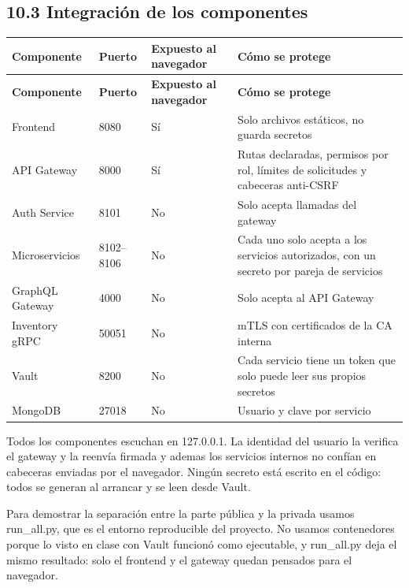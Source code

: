 \documentclass[10pt,letterpaper]{article}
\begin{document}
\subsection*{10.3 Integración de los componentes}
{\footnotesize
\begin{longtable}{|P{\tabcolsep\relax}|P{\tabcolsep\relax}|P{\tabcolsep\relax}|P{\tabcolsep\relax}|}
\hline
\textbf{Componente} & \textbf{Puerto} & \textbf{Expuesto al navegador} & \textbf{Cómo se protege} \\ \hline
\endfirsthead
\hline
\textbf{Componente} & \textbf{Puerto} & \textbf{Expuesto al navegador} & \textbf{Cómo se protege} \\ \hline
\endhead
Frontend & 8080 & Sí & Solo archivos estáticos, no guarda secretos \\ \hline
API Gateway & 8000 & Sí & Rutas declaradas, permisos por rol, límites de solicitudes y cabeceras anti-CSRF \\ \hline
Auth Service & 8101 & No & Solo acepta llamadas del gateway \\ \hline
Microservicios & 8102–8106 & No & Cada uno solo acepta a los servicios autorizados, con un secreto por pareja de servicios \\ \hline
GraphQL Gateway & 4000 & No & Solo acepta al API Gateway \\ \hline
Inventory gRPC & 50051 & No & mTLS con certificados de la CA interna \\ \hline
Vault & 8200 & No & Cada servicio tiene un token que solo puede leer sus propios secretos \\ \hline
MongoDB & 27018 & No & Usuario y clave por servicio \\ \hline
\end{longtable}}
Todos los componentes escuchan en 127.0.0.1. La identidad del usuario la verifica el gateway y la reenvía firmada y ademas los servicios internos no confían en cabeceras enviadas por el navegador. Ningún secreto está escrito en el código: todos se generan al arrancar y se leen desde Vault.

Para demostrar la separación entre la parte pública y la privada usamos run\_\allowbreak{}all.\allowbreak{}py, que es el entorno reproducible del proyecto. No usamos contenedores porque lo visto en clase con Vault funcionó como ejecutable, y run\_\allowbreak{}all.\allowbreak{}py deja el mismo resultado: solo el frontend y el gateway quedan pensados para el navegador.
\end{document}
